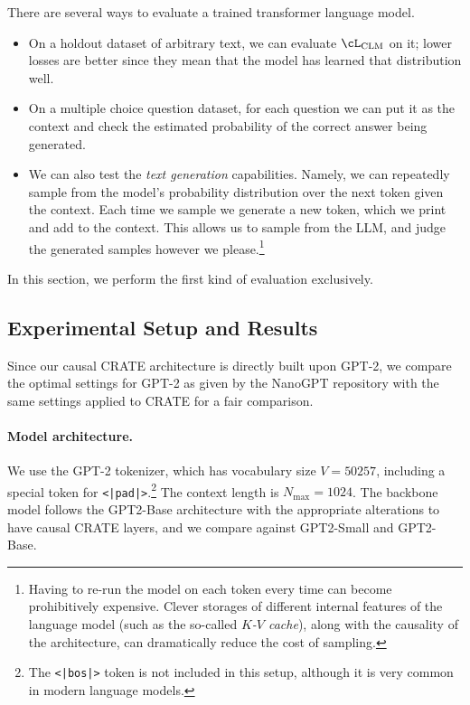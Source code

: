 \documentclass[../../book-main.tex]{subfiles}
\begin{document}
There are several ways to evaluate a trained transformer language model.
\begin{itemize}
\item On a holdout dataset of arbitrary text, we can evaluate
\(\cL_{\mathrm{CLM}}\) on it; lower losses are better since they mean
that the model has learned that distribution well.
\item On a multiple choice question dataset, for each question we can
put it as the context and check the estimated probability of the
correct answer being generated.
\item We can also test the \textit{text generation} capabilities.
Namely, we can repeatedly sample from the model's probability
distribution over the next token given the context. Each time we
sample we generate a new token, which we print and add to the
context. This allows us to sample from the LLM, and judge the
generated samples however we please.\footnote{Having to re-run the
model on each token every time can become prohibitively expensive.
Clever storages of different internal features of the language model
(such as the so-called \textit{\(K\)-\(V\) cache}), along with the
causality of the architecture, can dramatically reduce the cost of sampling.}
\end{itemize}
In this section, we perform the first kind of evaluation exclusively.

\subsection{Experimental Setup and Results}

Since our causal CRATE architecture is directly built upon GPT-2, we
compare the optimal settings for GPT-2 as given by the NanoGPT
repository \citep{nanogpt} with the same settings applied to CRATE
for a fair comparison.

\paragraph{Model architecture.} We use the GPT-2 tokenizer, which has
vocabulary size \(V = 50257\), including a special token for
\texttt{<|pad|>}.\footnote{The \texttt{<|bos|>} token is not included
in this setup, although it is very common in modern language models.}
The context length is \(N_{\max} = 1024\). The backbone model follows
the GPT2-Base architecture \citep{radford2019language} with the
appropriate alterations to have causal CRATE layers, and we compare
against GPT2-Small and GPT2-Base.
\end{document}
